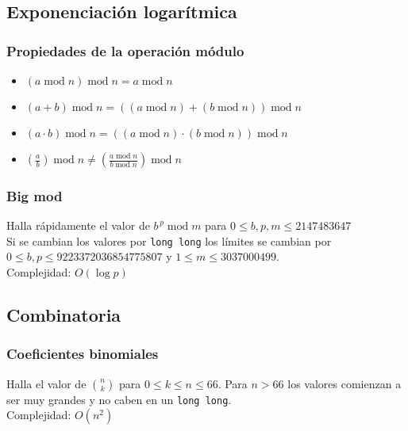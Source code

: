 \documentclass[10pt,letterpaper,twocolumn]{article}
\newcommand{\source}[1]{
	
	\dotfill
}
\begin{document}
	\subsection{Exponenciación logarítmica}
		\subsubsection{Propiedades de la operación módulo}
		\begin{itemize}
			\item $(a \operatorname{mod} n) \operatorname{mod} n = a \operatorname{mod} n$
			\item $(a + b) \operatorname{mod} n = ((a \operatorname{mod} n) + (b\operatorname{mod} n)) \operatorname{mod} n$
			\item $(a \cdot b) \operatorname{mod} n = ((a \operatorname{mod} n) \cdot (b\operatorname{mod} n)) \operatorname{mod} n$
			\item $\displaystyle\left(\frac{a}{b} \right) \operatorname{mod} n \neq \left(\frac{a \operatorname{mod} n}{b\operatorname{mod} n}\right) \operatorname{mod} n$
		\end{itemize}
		
		\subsubsection{Big mod}
		Halla rápidamente el valor de $b^{\,p} \operatorname{mod} m$ para $0 \leq b,p,m \leq 2147483647$\\
		Si se cambian los valores por \verb|long long| los límites se cambian por $0 \leq b,p \leq 9223372036854775807$ y $1 \leq m \leq 3037000499$.\\ 
		Complejidad: $O(\operatorname{log} p)$\\
		\source{./src/bigmod.cpp}
	
	\subsection{Combinatoria}
		\subsubsection{Coeficientes binomiales}
		Halla el valor de $\binom{n}{k}$ para $0 \leq k \leq n \leq 66$. Para $n > 66$ los valores comienzan a ser muy grandes y no caben en un \verb|long long|.\\
		Complejidad: $O(n^2)$\\
		\source{./src/binomial.cpp}
		
\end{document}
